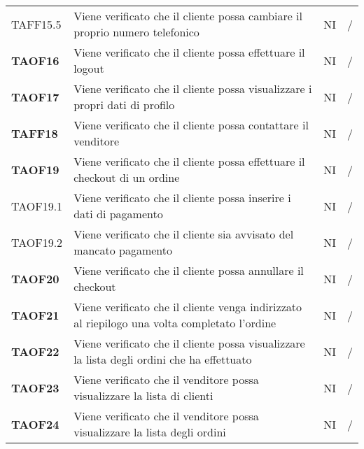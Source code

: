 \begin{center}
\begin{longtable}[!h]{p{60px} p{240px} p{35px} p{35px}}
        TAFF15.5        & Viene verificato che il cliente possa cambiare il proprio numero telefonico                                         & NI              & /              \\
        \textbf{TAOF16} & Viene verificato che il cliente possa effettuare il logout                                                          & NI              & /              \\
        \textbf{TAOF17} & Viene verificato che il cliente possa visualizzare i propri dati di profilo                                         & NI              & /              \\
        \textbf{TAFF18} & Viene verificato che il cliente possa contattare il venditore                                                       & NI             & /              \\
        \textbf{TAOF19} & Viene verificato che il cliente possa effettuare il checkout di un ordine                                           & NI              & /              \\
        TAOF19.1        & Viene verificato che il cliente possa inserire i dati di pagamento                                                  & NI              & /              \\
        TAOF19.2        & Viene verificato che il cliente sia avvisato del mancato pagamento                                         & NI              & /              \\
        \textbf{TAOF20} & Viene verificato che il cliente possa annullare il checkout                                                         & NI              & /              \\
        \textbf{TAOF21} & Viene verificato che il cliente venga indirizzato al riepilogo una volta completato l'ordine                       & NI              & /              \\
        \textbf{TAOF22} & Viene verificato che il cliente possa visualizzare la lista degli ordini che ha effettuato                          & NI              & /              \\
        \textbf{TAOF23} & Viene verificato che il venditore possa visualizzare la lista di clienti                                            & NI              & /              \\
        \textbf{TAOF24} & Viene verificato che il venditore possa visualizzare la lista degli ordini                                          & NI              & /              \\

\end{longtable}
\end{center}
